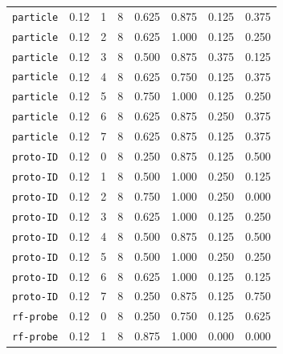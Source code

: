 \documentclass{article}
\begin{document}
\begin{center}
{\begin{tabular}{llllcccc}
\texttt{particle} & 0.12 & 1 & 8 & 0.625 & 0.875 & 0.125 & 0.375 \\
\texttt{particle} & 0.12 & 2 & 8 & 0.625 & 1.000 & 0.125 & 0.250 \\
\texttt{particle} & 0.12 & 3 & 8 & 0.500 & 0.875 & 0.375 & 0.125 \\
\texttt{particle} & 0.12 & 4 & 8 & 0.625 & 0.750 & 0.125 & 0.375 \\
\texttt{particle} & 0.12 & 5 & 8 & 0.750 & 1.000 & 0.125 & 0.250 \\
\texttt{particle} & 0.12 & 6 & 8 & 0.625 & 0.875 & 0.250 & 0.375 \\
\texttt{particle} & 0.12 & 7 & 8 & 0.625 & 0.875 & 0.125 & 0.375 \\
\texttt{proto-ID} & 0.12 & 0 & 8 & 0.250 & 0.875 & 0.125 & 0.500 \\
\texttt{proto-ID} & 0.12 & 1 & 8 & 0.500 & 1.000 & 0.250 & 0.125 \\
\texttt{proto-ID} & 0.12 & 2 & 8 & 0.750 & 1.000 & 0.250 & 0.000 \\
\texttt{proto-ID} & 0.12 & 3 & 8 & 0.625 & 1.000 & 0.125 & 0.250 \\
\texttt{proto-ID} & 0.12 & 4 & 8 & 0.500 & 0.875 & 0.125 & 0.500 \\
\texttt{proto-ID} & 0.12 & 5 & 8 & 0.500 & 1.000 & 0.250 & 0.250 \\
\texttt{proto-ID} & 0.12 & 6 & 8 & 0.625 & 1.000 & 0.125 & 0.125 \\
\texttt{proto-ID} & 0.12 & 7 & 8 & 0.250 & 0.875 & 0.125 & 0.750 \\
\texttt{rf-probe} & 0.12 & 0 & 8 & 0.250 & 0.750 & 0.125 & 0.625 \\
\texttt{rf-probe} & 0.12 & 1 & 8 & 0.875 & 1.000 & 0.000 & 0.000 \\
\bottomrule
\end{tabular}%
}
\end{center}
\end{document}
